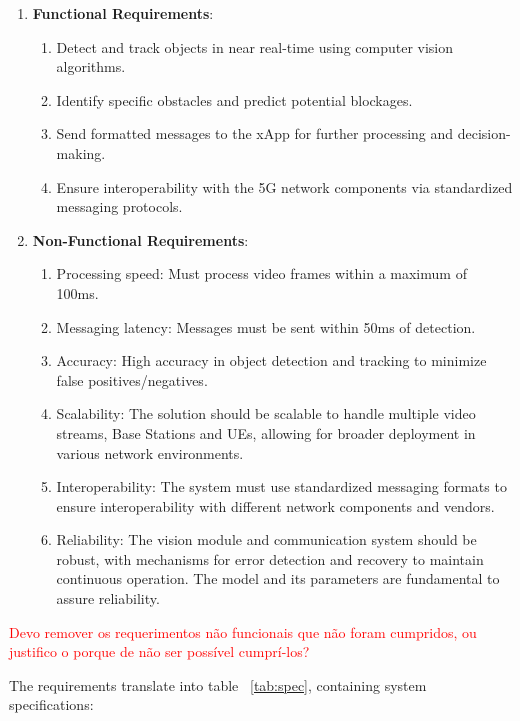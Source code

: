 \begin{enumerate}
    \item \textbf{Functional Requirements}:
    \begin{enumerate}
        \item Detect and track objects in near real-time using computer vision algorithms.
        \item Identify specific obstacles and predict potential blockages.
        \item Send formatted messages to the xApp for further processing and decision-making.
        \item Ensure interoperability with the 5G network components via standardized messaging protocols. %
    \end{enumerate}
    \item \textbf{Non-Functional Requirements}:
    \begin{enumerate}
        \item Processing speed: Must process video frames within a maximum of 100ms.
        \item Messaging latency: Messages must be sent within 50ms of detection.
        \item Accuracy: High accuracy in object detection and tracking to minimize false positives/negatives.
        \item Scalability: The solution should be scalable to handle multiple video streams, Base Stations and UEs, allowing for broader deployment in various network environments.
        \item Interoperability: The system must use standardized messaging formats to ensure interoperability with different network components and vendors.
        \item Reliability: The vision module and communication system should be robust, with mechanisms for error detection and recovery to maintain continuous operation. The model and its parameters are fundamental to assure reliability. %
    \end{enumerate}
\end{enumerate}
\textcolor{red}{Devo remover os requerimentos não funcionais que não foram cumpridos, ou justifico o porque de não ser possível cumprí-los?}

The requirements translate into table ~\ref{tab:spec}, containing system specifications:


